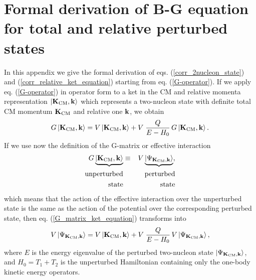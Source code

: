 \documentclass[aps,twocolumn,showpacs,preprintnumbers,amsmath,amssymb,nofootinbib,superscriptaddress,showkeys,noeprint]{revtex4-1}
\newcommand{\nk}{{\bf k}}
\newcommand{\nK}{{\bf K}}
\begin{document}
\appendix
\section{Formal derivation of B-G equation for
total and relative perturbed states}\label{formal_derivation}

In this appendix we give the formal derivation of eqs.
(\ref{corr_2nucleon_state}) and (\ref{corr_relative_ket_equation})
starting from eq. (\ref{G-operator}).  If we apply
eq. (\ref{G-operator}) in operator form to a ket in the CM and
relative momenta representation $\left| \nK_{\rm CM},\nk\right\rangle$
which represents a two-nucleon state with definite total CM momentum
$\nK_{\rm CM}$ and relative one $\nk$, we obtain
\begin{equation}\label{G_matrix_ket_equation}
G\left| \nK_{\rm CM},\nk\right\rangle =
V\left| \nK_{\rm CM},\nk\right\rangle+
V\;\frac{Q}{E-H_0}\,G\left| \nK_{\rm CM},\nk\right\rangle.
\end{equation}
If we use now the definition of the G-matrix or effective interaction
\begin{eqnarray}
G \underbrace{\left| \nK_{\rm CM},\nk\right\rangle} &\equiv&
V \underbrace{\left| \Psi_{\nK_{\rm CM},\nk}\right\rangle},
\label{definition_effective_interaction}\\
{\rm unperturbed}&&\quad {\rm perturbed} \nonumber\\
{\rm state}&&\quad \quad {\rm state}\nonumber
\end{eqnarray}
which means that the action of the effective interaction over the
unperturbed state is the same as the action of the potential over the
corresponding perturbed state, then eq. (\ref{G_matrix_ket_equation})
transforms into
\begin{equation}\label{V_matrix_ket_equation}
V\left| \Psi_{\nK_{\rm CM},\nk}\right\rangle =
V\left| \nK_{\rm CM},\nk\right\rangle +
V\;\frac{Q}{E-H_0}\,V\left| \Psi_{\nK_{\rm CM},\nk}\right\rangle,
\end{equation}
where $E$ is the energy eigenvalue of the perturbed two-nucleon state
$\left| \Psi_{\nK_{\rm CM},\nk}\right\rangle$, and $H_0= T_1+T_2$ is
the unperturbed Hamiltonian containing only the one-body kinetic
energy operators.
\end{document}
